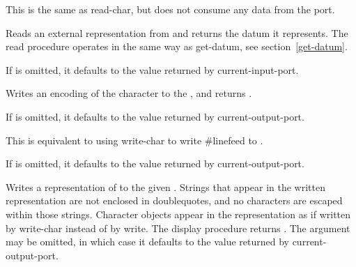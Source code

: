 \begin{entry}{%
}
   
This is the same as {\cf read-char}, but does not consume any data
from the port.
\end{entry}

\begin{entry}{%
}

Reads an external representation from 
and returns the datum it
represents.  The {\cf read} procedure operates in the same way as 
{\cf get-datum}, see section~\ref{get-datum}.

If  is omitted, it defaults to the value returned by
{\cf current-input-port}.
\end{entry}

\begin{entry}{%
}

Writes an encoding of the character  to the
, and returns \unspecifiedreturn.

If  is omitted, it defaults to the value returned by
{\cf current-output-port}.
\end{entry}

\begin{entry}{%
}

This is equivalent to using {\cf write-char} to write
{\cf \#\backwhack{}linefeed}
to .

If  is omitted, it defaults to the value returned by
{\cf current-output-port}.
\end{entry}

\begin{entry}{%
}

Writes a representation of  to the given .
Strings that appear in
the written representation are not enclosed in doublequotes, and no
characters are escaped within those strings.  Character objects appear
in the representation as if written by {\cf write-char} instead of by
{\cf write}.  The {\cf display} procedure returns \unspecifiedreturn.  The
 argument may be omitted, in which case it defaults
to the value returned by {\cf current-output-port}.
\end{entry}

